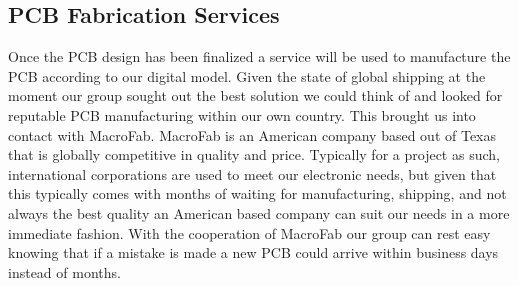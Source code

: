\subsection{PCB Fabrication Services}
Once the PCB design has been finalized a service will be used to manufacture the PCB according to our digital model. Given the state of global shipping at the moment our group sought out the best solution we could think of and looked for reputable PCB manufacturing within our own country. This brought us into contact with MacroFab. MacroFab is an American company based out of Texas that is globally competitive in quality and price. Typically for a project as such, international corporations are used to meet our electronic needs, but given that this typically comes with months of waiting for manufacturing, shipping, and not always the best quality an American based company can suit our needs in a more immediate fashion. With the cooperation of MacroFab our group can rest easy knowing that if a mistake is made a new PCB could arrive within business days instead of months.